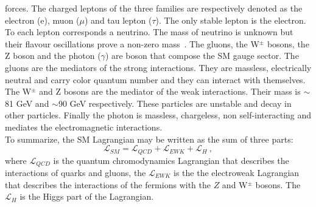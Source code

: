 forces. The charged leptons of the three families are respectively denoted as the electron
(e), muon ($\mu$) and tau lepton ($\tau$). The only stable lepton is the electron. To each lepton corresponds a neutrino. The mass of neutrino is unknown but their flavour oscillations prove a non-zero mass~\cite{Balantekin:2013tqa}. 
The gluons, the W$^{\pm}$ bosons, the Z boson and the photon ($\gamma$) are boson that compose the SM gauge sector.
The gluons are the mediators of the strong interactions. They are massless, electrically neutral and carry color quantum number and they can interact with themselves.
The  W$^{\pm}$ and Z bosons are the mediator of the weak interactions. Their mass is $\sim$81 GeV and $\sim$90 GeV respectively. These particles are unstable and decay in other particles. Finally the photon is massless, chargeless, non self-interacting and mediates the electromagnetic
interactions.\\
To summarize, the SM Lagrangian may be written as the sum of three parts:
\begin{equation}
 \mathcal{L}_{SM} = \mathcal{L}_{QCD}+\mathcal{L}_{EWK}+\mathcal{L}_{H}  \:,  \end{equation}
where $\mathcal{L}_{QCD}$ is the quantum chromodynamics Lagrangian that describes the interactions of quarks and gluons, the $\mathcal{L}_{EWK}$ is the the electroweak Lagrangian that describes the interactions of the fermions with the $Z$ and  W$^{\pm}$ bosons. The $\mathcal{L}_{H}$ is the Higgs part of the Lagrangian.

